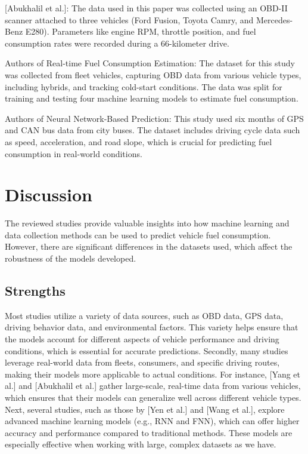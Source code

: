 \documentclass[letterpaper]{article}
\begin{document}
[Abukhalil et al.]: The data used in this paper was collected using an OBD-II scanner attached
to three vehicles (Ford Fusion, Toyota Camry, and Mercedes-Benz E280). Parameters like engine 
RPM, throttle position, and fuel consumption rates were recorded during a 66-kilometer drive. 

Authors of Real-time Fuel Consumption Estimation: The dataset for this study was collected 
from fleet vehicles, capturing OBD data from various vehicle types, including hybrids, and 
tracking cold-start conditions. The data was split for training and testing four machine
learning models to estimate fuel consumption. 

Authors of Neural Network-Based Prediction: This study used six months of GPS and CAN bus data 
from city buses. The dataset includes driving cycle data such as speed, acceleration, and road
slope, which is crucial for predicting fuel consumption in real-world conditions.

\section*{Discussion}

The reviewed studies provide valuable insights into how machine learning and data collection 
methods can be used to predict vehicle fuel consumption. However, there are significant 
differences in the datasets used, which affect the robustness of the models developed. 

\subsection*{Strengths}

Most studies utilize a variety of data sources, such as OBD data, GPS data, driving behavior
data, and environmental factors. This variety helps ensure that the models account for 
different aspects of vehicle performance and driving conditions, which is essential for 
accurate predictions. Secondly, many studies leverage real-world data from fleets, consumers, 
and specific driving routes, making their models more applicable to actual conditions. 
For instance, [Yang et al.] and [Abukhalil et al.] gather large-scale, real-time data from 
various vehicles, which ensures that their models can generalize well across different vehicle 
types. Next, several studies, such as those by [Yen et al.] and [Wang et al.], explore 
advanced machine learning models (e.g., RNN and FNN), which can offer higher accuracy and
performance compared to traditional methods. These models are especially effective when 
working with large, complex datasets as we have.
\end{document}
